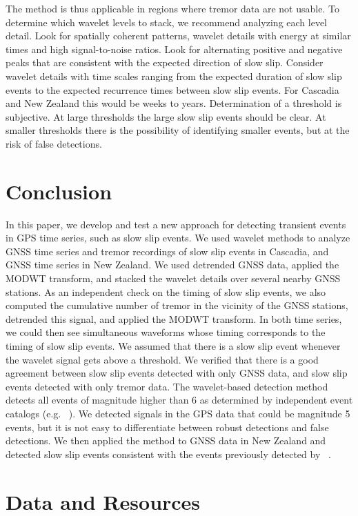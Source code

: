 \documentclass{article}
\begin{document}
The method is thus applicable in regions where tremor data are not usable. To determine which wavelet levels to stack, we recommend analyzing each level detail. Look for spatially coherent patterns, wavelet details with energy at similar times and high signal-to-noise ratios. Look for alternating positive and negative peaks that are consistent with the expected direction of slow slip. Consider wavelet details with time scales ranging from the expected duration of slow slip events to the expected recurrence times between slow slip events. For Cascadia and New Zealand this would be weeks to years. Determination of a threshold is subjective. At large thresholds the large slow slip events should be clear. At smaller thresholds there is the possibility of identifying smaller events, but at the risk of false detections.

\section{Conclusion}

In this paper, we develop and test a new approach for detecting transient events in GPS time series, such as slow slip events. We used wavelet methods to analyze GNSS time series and tremor recordings of slow slip events in Cascadia, and GNSS time series in New Zealand. We used detrended GNSS data, applied the MODWT transform, and stacked the wavelet details over several nearby GNSS stations. As an independent check on the timing of slow slip events, we also computed the cumulative number of tremor in the vicinity of the GNSS stations, detrended this signal, and applied the MODWT transform. In both time series, we could then see simultaneous waveforms whose timing corresponds to the timing of slow slip events. We assumed that there is a slow slip event whenever the wavelet signal gets above a threshold. We verified that there is a good agreement between slow slip events detected with only GNSS data, and slow slip events detected with only tremor data. The wavelet-based detection method detects all events of magnitude higher than 6 as determined by independent event catalogs (e.g. ~\citep{MIC_2019}). We detected signals in the GPS data that could be magnitude 5 events, but it is not easy to differentiate between robust detections and false detections. We then applied the method to GNSS data in New Zealand and detected slow slip events consistent with the events previously detected by ~\citet{TOD_2016}.

\section*{Data and Resources}
\end{document}

